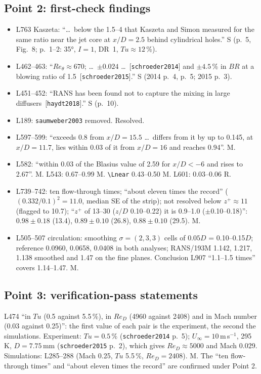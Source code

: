 \documentclass[10pt,a4paper]{article}
\newcommand*{\BR}{\mathit{BR}}
\newcommand*{\Reth}{\mathit{Re}_\theta}
\newcommand*{\ReD}{\mathit{Re}_D}
\newcommand*{\Tu}{\mathit{Tu}}
\renewcommand{\cite}[1]{[\texttt{#1}]}
\newcommand{\vS}{\textsf{S}}
\newcommand{\vM}{\textsf{M}}
\newcommand{\vR}{\textsf{R}}
\begin{document}
\subsection*{Point 2: first-check findings}
\begin{itemize}\itemsep0pt
\item L763 Kaszeta: ``\dots\ below the 1.5--4 that Kaszeta and Simon measured for the same ratio near the jet core at
  $x/D=2.5$ behind cylindrical holes.'' \vS{} (p.~5, Fig.~8; p.~1--2: 35°, $I=1$, DR~1, $Tu\approx12$\,\%).
\item L462--463: ``$\Reth\approx670$; \dots\ $\pm0.024$ \dots\ \cite{schroeder2014} and $\pm4.5$\,\% in $\BR$ at a
  blowing ratio of 1.5~\cite{schroeder2015}.'' \vS{} (2014 p.~4, p.~5; 2015 p.~3).
\item L451--452: ``RANS has been found not to capture the mixing in large diffusers~\cite{haydt2018}.'' \vS{} (p.~10).
\item L189: \texttt{saumweber2003} removed. Resolved.
\item L597--599: ``exceeds 0.8 from $x/D=15.5$ \dots\ differs from it by up to 0.145, at $x/D=11.7$, lies within 0.03 of
  it from $x/D=16$ and reaches 0.94''. \vM.
\item L582: ``within 0.03 of the Blasius value of 2.59 for $x/D<-6$ and rises to 2.67''. \vM. L543: 0.67--0.99 \vM.
  \verb|\Lnear| 0.43--0.50 \vM. L601: 0.03--0.06 \vR.
\item L739--742: ten flow-through times; ``about eleven times the record'' ($(0.332/0.1)^2=11.0$, median SE of the
  strip); not resolved below $z^+\approx11$ (flagged to 10.7); ``$z^+$ of 13--30 ($z/D$ 0.10--0.22) it is 0.9--1.0
  ($\pm$0.10--0.18)'': $0.98\pm0.18$ (13.4), $0.89\pm0.10$ (26.8), $0.88\pm0.10$ (29.5). \vM.
\item L505--507 circulation: smoothing $\sigma=(2,3,3)$ cells of $0.05D$ = 0.10--0.15$D$; reference 0.0960, 0.0658,
  0.0408 in both analyses; RANS/193M 1.142, 1.217, 1.138 smoothed and 1.47 on the fine planes. Conclusion L907
  ``1.1--1.5 times'' covers 1.14--1.47. \vM.
\end{itemize}

\subsection*{Point 3: verification-pass statements}
L474 ``in $\Tu$ (0.5 against 5.5\,\%), in $\ReD$ (4960 against 2408) and in Mach number (0.03 against 0.25)'': the
first value of each pair is the experiment, the second the simulations. Experiment: $Tu=0.5$\,\%
(\texttt{schroeder2014} p.~5); $U_\infty=10$\,m\,s$^{-1}$, 295\,K, $D=7.75$\,mm (\texttt{schroeder2015} p.~2), which
gives $\ReD\approx5000$ and Mach 0.029. Simulations: L285--288 (Mach 0.25, $Tu$ 5.5\,\%, $\ReD=2408$). \vM. The
``ten flow-through times'' and ``about eleven times the record'' are confirmed under Point 2.
\end{document}
